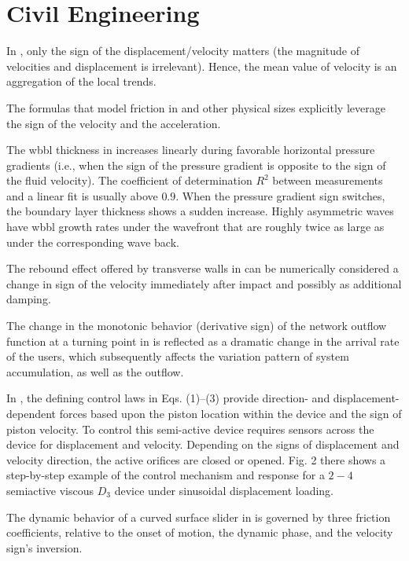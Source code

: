 \documentclass[11pt]{book}
\begin{document}

\section{Civil Engineering}

In \cite{austin2007phase}, only the sign of the displacement/velocity
matters (the magnitude of velocities and displacement is irrelevant).
Hence, the mean value of velocity is an aggregation of the local trends.

The formulas that model friction in \cite{athanasiou2011modelling}
and other physical sizes explicitly leverage the sign of the velocity
and the acceleration.

The wbbl thickness in \cite{henriquez2014piv} increases linearly
during favorable horizontal pressure gradients (i.e., when the sign
of the pressure gradient is opposite to the sign of the fluid velocity).
The coefficient of determination $R^{2}$ between measurements and
a linear fit is usually above $0.9$. When the pressure gradient sign
switches, the boundary layer thickness shows a sudden increase. Highly
asymmetric waves have wbbl growth rates under the wavefront that are
roughly twice as large as under the corresponding wave back.

The rebound effect offered by transverse walls in \cite{giresini2015comparison}
can be numerically considered a change in sign of the velocity immediately
after impact and possibly as additional damping.

The change in the monotonic behavior (derivative sign) of the network
outflow function at a turning point in \cite{amirgholy2017modeling}
is reflected as a dramatic change in the arrival rate of the users,
which subsequently affects the variation pattern of system accumulation,
as well as the outflow.

In \cite{hazaveh2017experimental}, the defining control laws in Eqs.
(1)--(3) provide direction- and displacement-dependent forces based
upon the piston location within the device and the sign of piston
velocity. To control this semi-active device requires sensors across
the device for displacement and velocity. Depending on the signs of
displacement and velocity direction, the active orifices are closed
or opened. Fig. 2 there shows a step-by-step example of the control
mechanism and response for a $2-4$ semiactive viscous $D_{3}$ device
under sinusoidal displacement loading.

The dynamic behavior of a curved surface slider in \cite{saitta2018base}
is governed by three friction coefficients, relative to the onset
of motion, the dynamic phase, and the velocity sign's inversion.
\end{document}

